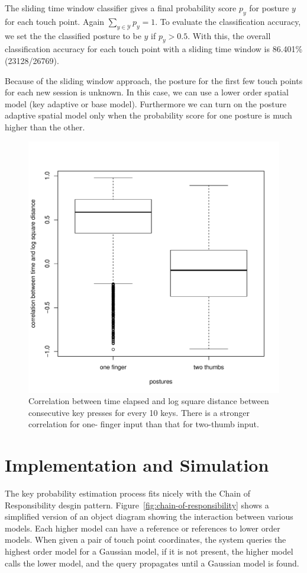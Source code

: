 \documentclass{sigchi}
\begin{document}
The sliding time window classifier gives a final probability score $p_y$ for posture
$y$ for each touch point. Again $\displaystyle\sum_{y\in \mathcal{Y}}p_y = 1$. To evaluate the classification accuracy, we set the the
classified posture to be $y$ if $p_y > 0.5$. With this, the overall classification 
accuracy for each touch point with a sliding time window
is 86.401\% (23128/26769).

Because of the sliding window approach, the posture for the first few touch points  
for each new session is unknown. In this case, we can use a lower order spatial 
model (key adaptive or base model). Furthermore  we can turn on the posture 
adaptive spatial model only when the probability score for one posture is much 
higher than the other.

\begin{figure}[tb]
  \centering
  \includegraphics[width=0.8\columnwidth]{figures/boxplot.pdf}
  \caption{Correlation between time elapsed and log square distance between
  consecutive key presses for every 10 keys. There is a stronger correlation for
  one- finger input than that for two-thumb input.}
  \label{fig:boxplot}
\end{figure}

\section{Implementation and Simulation}
The key probability estimation process fits nicely with the
Chain of Responsibility desgin pattern.
Figure~\ref{fig:chain-of-responsibility} shows a simplified version of an object
diagram showing the interaction between various models. Each higher model can
have a reference or references to lower order models. When given a pair of touch
point coordinates, the system queries the highest order model for a Gaussian
model, if it is not present, the higher model calls the lower model, and the
query propagates until a Gaussian model is found.
\end{document}
